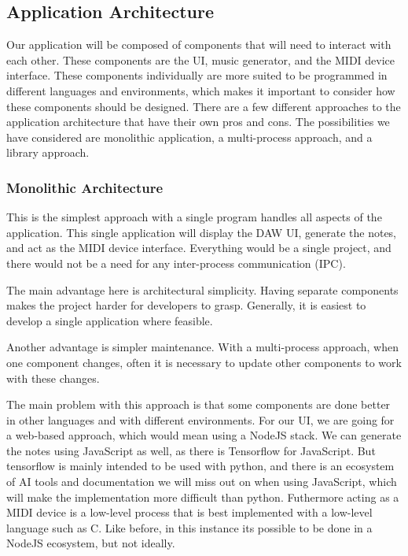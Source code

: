 \subsection{Application Architecture}
\label{sec:app_architecture}

Our application will be composed of components that will need to interact with each other.
These components are the UI, music generator, and the MIDI device interface. These
components individually are more suited to be programmed in different languages and
environments, which makes it important to consider how these components should be
designed. There are a few different approaches to the application architecture that have
their own pros and cons. The possibilities we have considered are monolithic application,
a multi-process approach, and a library approach.

\subsubsection{Monolithic Architecture}

This is the simplest approach with a single program handles all aspects of the
application. This single application will display the DAW UI, generate the notes, and act
as the MIDI device interface. Everything would be a single project, and there would not be
a need for any inter-process communication (IPC).

The main advantage here is architectural simplicity. Having separate components makes the
project harder for developers to grasp. Generally, it is easiest to develop a single
application where feasible.

Another advantage is simpler maintenance. With a multi-process approach, when one
component changes, often it is necessary to update other components to work with these
changes.

The main problem with this approach is that some components are done better in other
languages and with different environments. For our UI, we are going for a web-based
approach, which would mean using a NodeJS stack. We can generate the notes using
JavaScript as well, as there is Tensorflow for JavaScript. But tensorflow is mainly
intended to be used with python, and there is an ecosystem of AI tools and documentation
we will miss out on when using JavaScript, which will make the implementation more
difficult than python. Futhermore acting as a MIDI device is a low-level process that is
best implemented with a low-level language such as C. Like before, in this instance its
possible to be done in a NodeJS ecosystem, but not ideally.

